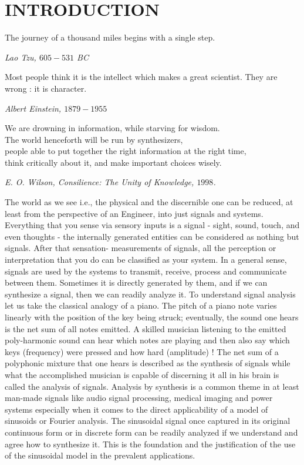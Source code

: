 \documentclass{UCF_ETD}
\begin{document}
\tableofcontents

\listoffigures

\listoftables

\mainmatter

\chapter{INTRODUCTION} 

\epigraph{The journey of a thousand miles begins with a single step.}
{\itshape Lao Tzu,  $605 - 531$ BC }

\epigraph{Most people think it is the intellect which makes a great scientist. They are wrong : it is character.}{ \itshape Albert Einstein, $1879-1955$}

\epigraph{  We are drowning in information, 
while starving for wisdom. \\
The world henceforth will be run by synthesizers, \\
people able to put together 
the right information at the right time,  \\
think critically about it,  
and make important choices wisely.}{\itshape E. O. Wilson,  Consilience: The Unity of Knowledge, $1998$.}

The world as we see i.e., the physical and the discernible one can be reduced, at least from the perspective of an Engineer, into just signals and systems. Everything that you sense via sensory inputs is a signal - sight, sound, touch, and even thoughts - the internally generated entities can be considered as nothing but signals. After that sensation- measurements of signals, all the perception or interpretation that you do can be classified as your system. In a general sense, signals are used by the systems to transmit, receive, process and communicate between them. Sometimes it is directly generated by them, and if we can synthesize a signal, then we can readily analyze it. To understand signal analysis let us take the classical analogy of a piano. The pitch of a piano note varies linearly with the position of the key being struck; eventually, the sound one hears is the net sum of all notes emitted. A skilled musician listening to the emitted poly-harmonic sound can hear which notes are playing and then also say which keys (frequency) were pressed and how hard (amplitude) ! The net sum of a polyphonic mixture that one hears is described as the synthesis of signals while what the accomplished musician is capable of discerning it all in his brain is called the analysis of signals.  Analysis by synthesis is a common theme in at least man-made signals like audio signal processing, medical imaging and power systems especially when it comes to the direct applicability of a model of sinusoids or Fourier analysis. The sinusoidal signal once captured in its original continuous form or in discrete form can be readily analyzed if we understand and agree how to synthesize it. This is the foundation and the justification of the use of the sinusoidal model in the prevalent applications. 
\end{document}
